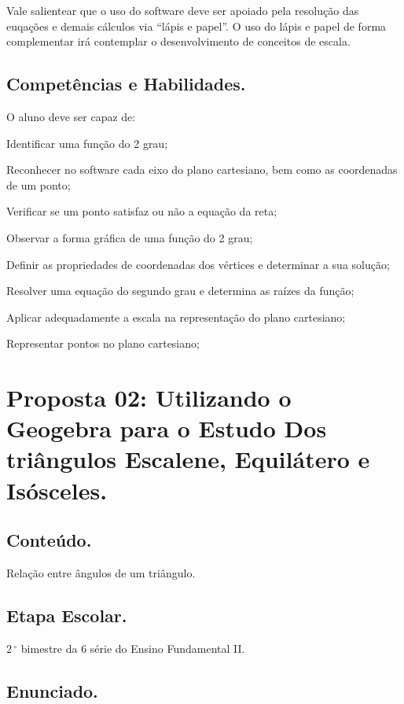 \documentclass[a4paper,12pt]{article}
\begin{document}
Vale salientear que o uso do software deve ser apoiado pela resolução das euqações e demais cálculos via “lápis e papel”. O uso do lápis e papel de forma complementar irá contemplar o desenvolvimento de conceitos de escala.

\subsection{Competências e Habilidades.}

O aluno deve ser capaz de:
\begin{list}{) }{}
\item Identificar uma função do 2 grau;
\item Reconhecer no software cada eixo do plano cartesiano, bem como as coordenadas de um ponto;
\item Verificar se um ponto satisfaz ou não a equação da reta;
\item Observar a forma gráfica de uma função do 2 grau;
\item Definir as propriedades de coordenadas dos vértices e determinar a sua solução;
\item Resolver uma equação do segundo grau e determina as raízes da função;
\item Aplicar adequadamente a escala na representação do plano cartesiano;
\item Representar pontos no plano cartesiano;
\end{list}

\section {Proposta 02: Utilizando o Geogebra para o Estudo Dos triângulos Escalene, Equilátero e Isósceles.}

\subsection{Conteúdo.}

Relação entre ângulos de um triângulo.

\subsection{Etapa Escolar.}

$2\,^{\circ}$ bimestre da 6{\textordfeminine} série do Ensino Fundamental II.

\subsection{Enunciado.}
\end{document}
